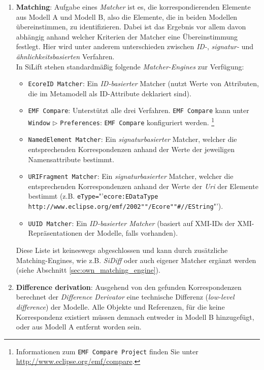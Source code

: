 \begin{enumerate}

\item \textbf{Matching}: 
Aufgabe eines \textit{Matcher} ist es, die korrespondierenden Elemente aus Modell A und Modell B, also die Elemente, die in beiden Modellen übereinstimmen, zu identifizieren.
Dabei ist das Ergebnis vor allem davon abhängig anhand welcher Kriterien der Matcher eine Übereinstimmung festlegt.
Hier wird unter anderem unterschieden zwischen \textit{ID-}, \textit{signatur-} und \textit{ähnlichkeitsbasierten} Verfahren.\\
In SiLift stehen standardmäßig folgende \textit{Matcher-Engines} zur Verfügung:

\begin{itemize}
	\item \texttt{EcoreID Matcher}: Ein \textit{ID-basierter} Matcher (nutzt Werte von Attributen, die im Metamodell als ID-Attribute deklariert sind).
	\item \texttt{EMF Compare}: 
	Unterstützt alle drei Verfahren. \texttt{EMF Compare} kann unter \texttt{Win\-dow} $\triangleright$ \texttt{Preferences}: \texttt{EMF Compare} konfiguriert werden. \footnote{Informationen zum \texttt{EMF Compare Project} finden Sie unter \url{http://www.eclipse.org/emf/compare}.}
	
	\item \texttt{NamedElement Matcher}: 
	Ein \textit{signaturbasierter} Matcher, welcher die ent\-sprech\-en\-den Korrespondenzen anhand der Werte der jeweiligen Namensattribute bestimmt.
	
	\item \texttt{URIFragment Matcher}: 
	Ein \textit{signaturbasierter} Matcher, welcher die ent\-sprech\-en\-den Korrespondenzen anhand der Werte der \textit{Uri} der Elemente bestimmt (z.B. \texttt{eType=}"'\texttt{ecore:EDataType http://www.eclipse.org/emf/2002""/Ecore""\#//EString}"').
	
	\item \texttt{UUID Matcher}: Ein \textit{ID-basierter Matcher} (basiert auf XMI-IDs der XMI-Repräsentationen der Modelle, falls vorhanden).
\end{itemize}

Diese Liste ist keineswegs abgeschlossen und kann durch zusätzliche Matching-Engines, wie z.B. \textit{SiDiff} oder auch eigener Matcher ergänzt werden (siehe Abschnitt \ref{sec:own_matching_engine}). \\

\item \textbf{Difference derivation}: 
Ausgehend von den gefunden Korrespondenzen berechnet der \textit{Difference Derivator} eine technische Differenz (\textit{low-level difference}) der Mo\-del\-le.
Alle Objekte und Referenzen, für die keine Korrespondenz existiert müssen demnach entweder in Modell B hinzugefügt, oder aus Modell A entfernt worden sein.


\end{enumerate}
